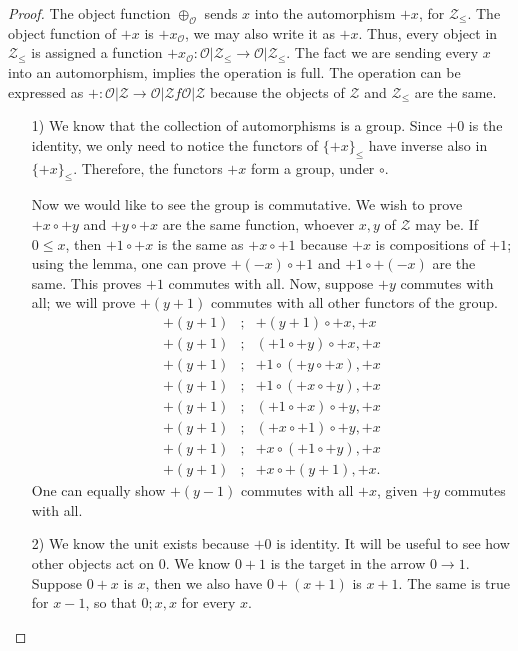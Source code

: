 \documentclass [12pt]{book}
\begin{document}
\begin{proof}The object function $\oplus_\mathcal O$ sends $x$ into the automorphism $+x$, for $\mathcal Z_\leq$. The object function of $+x$ is $+x_\mathcal O$, we may also write it as $+x$. Thus, every object in $\mathcal Z_\leq$ is assigned a function $+x_\mathcal O:\mathcal{O|Z_\leq}\rightarrow\mathcal{O|Z_\leq}$. The fact we are sending every $x$ into an automorphism, implies the operation is full. The operation can be expressed as $+:\mathcal{O|Z}\rightarrow\mathcal{O|Z}f\mathcal{O|Z}$ because the objects of $\mathcal Z$ and $\mathcal Z_\leq$ are the same.\begin{itemize}\item[1)]We know that the collection of automorphisms is a group. Since $+0$ is the identity, we only need to notice the functors of $\{+x\}_\leq$ have inverse also in $\{+x\}_\leq$. Therefore, the functors $+x$ form a group, under $\circ$.

Now we would like to see the group is commutative. We wish to prove $+x\circ+y$ and $+y\circ+x$ are the same function, whoever $x,y$ of $\mathcal Z$ may be. If $0\leq x$, then $+1\circ +x$ is the same as $+x\circ +1$ because $+x$ is compositions of $+1$; using the lemma, one can prove $+(-x)\circ+1$ and $+1\circ+(-x)$ are the same. This proves $+1$ commutes with all. Now, suppose $+y$ commutes with all; we will prove $+(y+1)$ commutes with all other functors of the group.\begin{eqnarray}\nonumber+(y+1)&;&+(y+1)\circ+x,+x\\\nonumber+(y+1)&;&(+1\circ+y)\circ+x,+x\\\nonumber+(y+1)&;&+1\circ(+y\circ+x),+x\\\nonumber+(y+1)&;&+1\circ(+x\circ+y),+x\\\nonumber+(y+1)&;&(+1\circ+x)\circ+y,+x\\\nonumber+(y+1)&;&(+x\circ+1)\circ+y,+x\\\nonumber+(y+1)&;&+x\circ(+1\circ+y),+x\\\nonumber+(y+1)&;&+x\circ+(y+1),+x.\end{eqnarray}One can equally show $+(y-1)$ commutes with all $+x$, given $+y$ commutes with all.

\item[2)] We know the unit exists because $+0$ is identity. It will be useful to see how other objects act on 0. We know $0+1$ is the target in the arrow $0\rightarrow1$. Suppose $0+x$ is $x$, then we also have $0+(x+1)$ is $x+1$. The same is true for $x-1$, so that $0;x,x$ for every $x$.


\end{itemize}
\end{proof}
\end{document}
